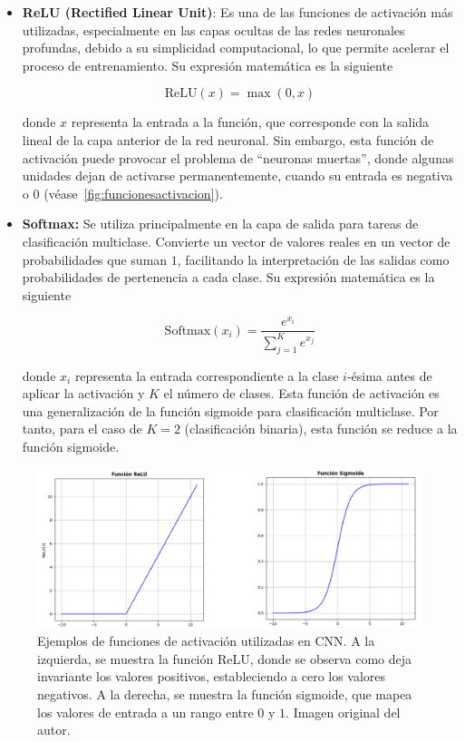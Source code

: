 \begin{itemize}
    \item \textbf{ReLU (Rectified Linear Unit)}: Es una de las funciones de activación más utilizadas, especialmente en las capas ocultas de las redes neuronales profundas, debido a su simplicidad computacional, lo que permite acelerar el proceso de entrenamiento. Su expresión matemática es la siguiente
    
    \[
        \text{ReLU}(x) = \max(0, x)
    \]

    donde $x$ representa la entrada a la función, que corresponde con la salida lineal de la capa anterior de la red neuronal. Sin embargo, esta función de activación puede provocar el problema de ``neuronas muertas'', donde algunas unidades dejan de activarse permanentemente, cuando su entrada es negativa o $0$ (véase~\autoref{fig:funcionesactivacion}).

    \item \textbf{Softmax:} Se utiliza principalmente en la capa de salida para tareas de clasificación multiclase. Convierte un vector de valores reales en un vector de probabilidades que suman $1$, facilitando la interpretación de las salidas como probabilidades de pertenencia a cada clase. Su expresión matemática es la siguiente
 
    \[
        \text{Softmax}(x_i) = \frac{e^{x_i}}{\sum_{j=1}^{K} e^{x_j}}
    \]

    donde $x_i$ representa la entrada correspondiente a la clase $i$-ésima antes de aplicar la activación y $K$ el número de clases. Esta función de activación es una generalización de la función sigmoide para clasificación multiclase. Por tanto, para el caso de $K=2$ (clasificación binaria), esta función se reduce a la función sigmoide.\newline

\end{itemize}

\begin{figure}[h]
    \centering
    \includegraphics[width=0.8\linewidth]{img/funcionesactivacion.png}
    \caption[Ejemplos de funciones de activación utilizadas en CNN.]{Ejemplos de funciones de activación utilizadas en CNN. A la izquierda, se muestra la función ReLU, donde se observa como deja invariante los valores positivos, estableciendo a cero los valores negativos. A la derecha, se muestra la función sigmoide, que mapea los valores de entrada a un rango entre $0$ y $1$. Imagen original del autor.}\label{fig:funcionesactivacion}
\end{figure}


